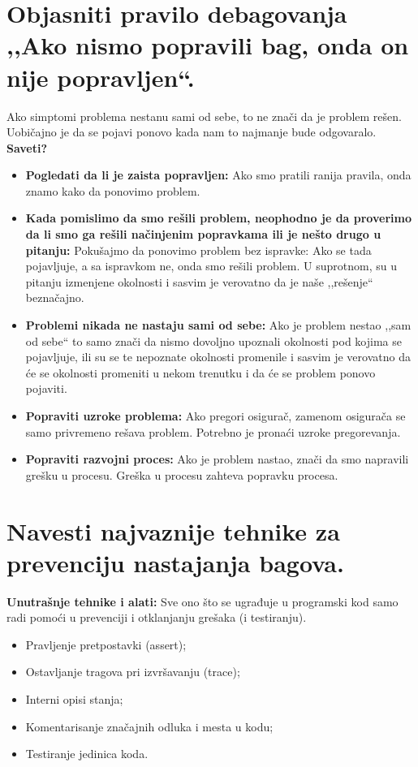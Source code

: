 \documentclass[a4paper]{article}
\begin{document}
\section{Objasniti pravilo debagovanja ,,Ako nismo popravili bag, onda on nije popravljen``.}
  Ako simptomi problema nestanu sami od sebe, to ne znači da je problem rešen. Uobičajno je da se
  pojavi ponovo kada nam to najmanje bude odgovaralo.\\
  \textbf{Saveti?}
  \begin{itemize}
    \item \textbf{Pogledati da li je zaista popravljen:} Ako smo pratili ranija pravila, onda znamo
          kako da ponovimo problem.
    \item \textbf{Kada pomislimo da smo rešili problem, neophodno je da proverimo da li
          smo ga rešili načinjenim popravkama ili je nešto drugo u pitanju:} Pokušajmo da ponovimo
          problem bez ispravke: Ako se tada pojavljuje, a sa ispravkom ne, onda smo rešili problem.
          U suprotnom, su u pitanju izmenjene okolnosti i sasvim je verovatno da je naše ,,rešenje``
          beznačajno. 
    \item \textbf{Problemi nikada ne nastaju sami od sebe:} Ako je problem nestao ,,sam od sebe`` to
          samo znači da nismo dovoljno upoznali okolnosti pod kojima se pojavljuje, ili su se te
          nepoznate okolnosti promenile i sasvim je verovatno da će se okolnosti promeniti u nekom
          trenutku i da će se problem ponovo pojaviti.
    \item \textbf{Popraviti uzroke problema:} Ako pregori osigurač, zamenom osigurača se samo privremeno
          rešava problem. Potrebno je pronaći uzroke pregorevanja. 
    \item \textbf{Popraviti razvojni proces:} Ako je problem nastao, znači da smo napravili grešku
          u procesu. Greška u procesu zahteva popravku procesa.  
  \end{itemize}

\section{Navesti najvaznije tehnike za prevenciju nastajanja bagova.}
  \textbf{Unutrašnje tehnike i alati:} Sve ono što se ugrađuje u programski kod
  samo radi pomoći u prevenciji i otklanjanju grešaka (i testiranju).
  \begin{itemize}
    \item Pravljenje pretpostavki (assert);
    \item Ostavljanje tragova pri izvršavanju (trace);
    \item Interni opisi stanja;
    \item Komentarisanje značajnih odluka i mesta u kodu;
    \item Testiranje jedinica koda.
  \end{itemize}
\end{document}
